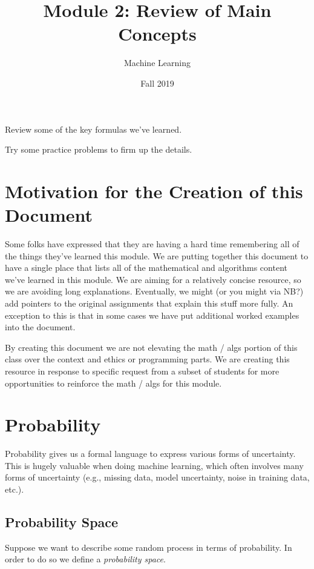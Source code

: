\documentclass{tufte-handout}
\title{Module 2: Review of Main Concepts}
\author{Machine Learning}
\date{Fall 2019}
\begin{document}
\maketitle
\thispagestyle{firstpage}

\begin{learningobjectives}
\bi
\item Review some of the key formulas we've learned.
\item Try some practice problems to firm up the details.
\ei
\end{learningobjectives}

\section{Motivation for the Creation of this Document}

Some folks have expressed that they are having a hard time remembering all of the things they've learned this module.  We are putting together this document to have a single place that lists all of the mathematical and algorithms content we've learned in this module.  We are aiming for a relatively concise resource, so we are avoiding long explanations.  Eventually, we might (or you might via NB?) add pointers to the original assignments that explain this stuff more fully.  An exception to this is that in some cases we have put additional worked examples into the document.

\vspace{1em}
\begin{notice}
By creating this document we are not elevating the math / algs portion of this class over the context and ethics or programming parts.  We are creating this resource in response to specific request from a subset of students for more opportunities to reinforce the math / algs for this module.
\end{notice}

\section{Probability}

Probability gives us a formal language to express various forms of uncertainty.  This is hugely valuable when doing machine learning, which often involves many forms of uncertainty (e.g., missing data, model uncertainty, noise in training data, etc.).

\subsection{Probability Space}
Suppose we want to describe some random process in terms of probability.  In order to do so we define a \emph{probability space}.
\end{document}
